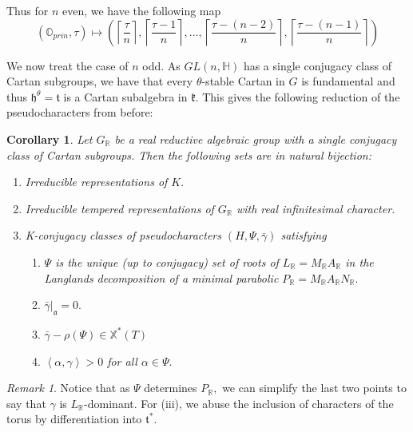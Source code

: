 \documentclass[letterpaper,twosided,11pt]{article}
\theoremstyle{plain}
\newtheorem{corollary}[theorem]{Corollary}
\theoremstyle{definition}
\theoremstyle{remark}
\newtheorem{remark}{Remark}
\newcommand{\HH}{\mathbb{H}}
\newcommand{\R}{\mathbb{R}}
\newcommand{\OO}{\mathbb{O}}
\newcommand{\ip}[1]{\left \langle #1 \right \rangle}
\newcommand{\lie}[1]{\mathfrak{#1}}
\begin{document}
Thus for $ n $ even, we have the following map
\begin{equation}
    (\OO_{prin},\tau)\mapsto \left( \left\lceil \frac{\tau}{n} \right
    \rceil, \left\lceil \frac{\tau-1}{n} \right \rceil ,...,\left\lceil
    \frac{\tau-(n-2)}{n} \right \rceil ,\left\lceil \frac{\tau-(n-1)}{n}
    \right \rceil \right)
\end{equation}

We now treat the case of $ n $ odd.  As $ GL(n,\HH) $ has a single
conjugacy class of Cartan subgroups, we have that every $ \theta $-stable
Cartan in $ G $ is fundamental and thus $ \lie{h}^\theta=\lie{t} $ is a
Cartan subalgebra in $ \lie{k}. $ This gives the following reduction of
the pseudocharacters from before:

\begin{corollary}
    \cite[Theorem 1.2]{Vogan2007} Let $ G_\R $ be a real reductive
    algebraic group with a single conjugacy class of Cartan subgroups.
    Then the following sets are in natural bijection:
    \begin{enumerate}
        \item
            Irreducible representations of $ K. $
        \item
            Irreducible tempered representations of $ G_\R $ with real
            infinitesimal character.
        \item
            K-conjugacy classes of pseudocharacters $ (H,\Psi, \bar{\gamma})
            $ satisfying
            \begin{enumerate}
                \item
                    $ \Psi $ is the unique (up to conjugacy) set of
                    roots of $ L_\R=M_\R A_\R $ in the Langlands
                    decomposition of a minimal parabolic $ P_\R=M_\R A_\R
                    N_\R. $
                \item
                    $ \bar{\gamma}|_\lie{a}=0. $
                \item
                    $ \bar{\gamma}-\rho(\Psi)\in \mathbb{X}^*(T) $
                \item
                    $ \ip{\alpha,\gamma}>0 $ for all $ \alpha\in \Psi. $
            \end{enumerate}
    \end{enumerate}
\end{corollary}

\begin{remark}
    Notice that as $ \Psi $ determines $ P_\R, $ we can simplify the
    last two points to say that $ \gamma $ is $ L_\R $-dominant.  For (iii),
    we abuse the inclusion of characters of the torus by differentiation
    into $ \lie{t}^*. $
\end{remark}
\end{document}
